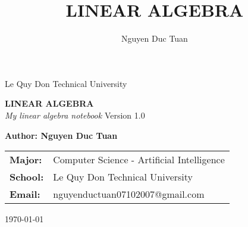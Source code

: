 \documentclass[12pt, a4paper, oneside]{book}
\title{LINEAR ALGEBRA}
\author{Nguyen Duc Tuan}
\begin{document}
\frontmatter 

\begin{titlepage}
    \centering %
    

    {\large Le Quy Don Technical University} \\
    \vspace{0.25cm}
   
    
    \vfill %
    
    {\Huge \bfseries LINEAR ALGEBRA} \\
    \vspace{0.5cm}
    {\Large \itshape My linear algebra notebook}
    \vspace{1cm}
    {\large Version 1.0} \\ %
    
    \vfill %
    
    {\Large \bfseries Author: Nguyen Duc Tuan}
    \vspace{0.5cm}
    
    \begin{tabular}{l l}
        \bfseries Major: & Computer Science - Artificial Intelligence \\
        \bfseries School: & Le Quy Don Technical University \\
        \bfseries Email: & nguyenductuan07102007@gmail.com \\
    \end{tabular}
    
    \vspace{1cm}
    
    {\large \today}

\end{titlepage}

\tableofcontents 

\mainmatter 

 

\end{document}

